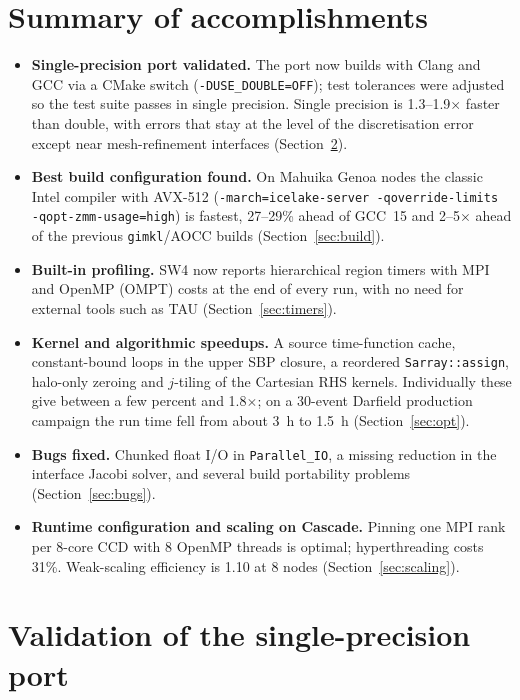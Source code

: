 \documentclass[11pt,a4paper]{article}
\newcommand{\code}[1]{\texttt{#1}}
\begin{document}
\section{Summary of accomplishments}

\begin{itemize}[itemsep=2pt]
  \item \textbf{Single-precision port validated.} The port now builds with
        Clang and GCC via a CMake switch (\code{-DUSE\_DOUBLE=OFF}); test
        tolerances were adjusted so the test suite passes in single precision.
        Single precision is 1.3--1.9$\times$ faster than double, with errors
        that stay at the level of the discretisation error except near
        mesh-refinement interfaces (Section~\ref{sec:validation}).
  \item \textbf{Best build configuration found.} On Mahuika Genoa nodes the
        classic Intel compiler with AVX-512 (\code{-march=icelake-server
        -qoverride-limits -qopt-zmm-usage=high}) is fastest, 27--29\% ahead of
        GCC~15 and 2--5$\times$ ahead of the previous \code{gimkl}/AOCC builds
        (Section~\ref{sec:build}).
  \item \textbf{Built-in profiling.} SW4 now reports hierarchical region
        timers with MPI and OpenMP (OMPT) costs at the end of every run, with
        no need for external tools such as TAU (Section~\ref{sec:timers}).
  \item \textbf{Kernel and algorithmic speedups.} A source time-function
        cache, constant-bound loops in the upper SBP closure, a reordered
        \code{Sarray::assign}, halo-only zeroing and $j$-tiling of the
        Cartesian RHS kernels. Individually these give between a few percent
        and 1.8$\times$; on a 30-event Darfield production campaign the
        run time fell from about 3~h to 1.5~h (Section~\ref{sec:opt}).
  \item \textbf{Bugs fixed.} Chunked float I/O in \code{Parallel\_IO},
        a missing reduction in the interface Jacobi solver, and several
        build portability problems (Section~\ref{sec:bugs}).
  \item \textbf{Runtime configuration and scaling on Cascade.} Pinning one
        MPI rank per 8-core CCD with 8 OpenMP threads is optimal;
        hyperthreading costs 31\%. Weak-scaling efficiency is 1.10 at 8 nodes
        (Section~\ref{sec:scaling}).
\end{itemize}

\section{Validation of the single-precision port}
\label{sec:validation}
\end{document}
